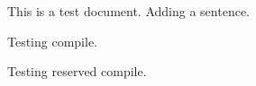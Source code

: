 \documentclass{article}
\begin{document}
This is a test document.
Adding a sentence.

Testing compile.

Testing reserved compile.
\end{document}
